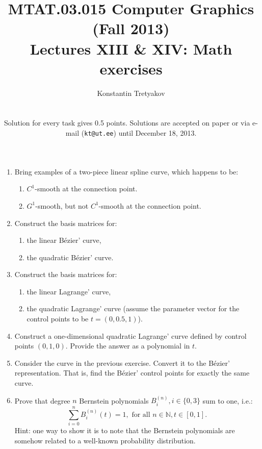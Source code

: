 \documentclass{article}
\newcommand{\Bezier}{B\'{e}zier}
\begin{document}
\title{MTAT.03.015 Computer Graphics (Fall 2013)\\
Lectures XIII \& XIV: Math exercises}
\author{Konstantin Tretyakov\\
\medskip
\\
\parbox{9cm}{\small Solution for every task gives 0.5 points. Solutions are accepted on paper or via e-mail (\texttt{kt@ut.ee}) until December 18, 2013.}
}
\date{}
\maketitle


\begin{enumerate}
\item Bring examples of a two-piece linear spline curve, which happens to be:
\begin{enumerate}
\item $C^1$-smooth at the connection point.
\item $G^1$-smooth, but not $C^1$-smooth at the connection point.
\end{enumerate}

\item Construct the basis matrices for:
\begin{enumerate}
\item the linear \Bezier' curve,
\item the quadratic \Bezier' curve.
\end{enumerate}

\item Construct the basis matrices for:
\begin{enumerate}
\item the linear Lagrange' curve,
\item the quadratic Lagrange' curve (assume the parameter vector for the control points to be $t=(0, 0.5, 1)$).
\end{enumerate}

\item Construct a one-dimensional quadratic Lagrange' curve defined by control points $(0, 1, 0)$. Provide the answer as a polynomial in $t$.

\item Consider the curve in the previous exercise. Convert it to the \Bezier' representation. That is, find the \Bezier' control points for exactly the same curve.

\item Prove that degree $n$ Bernstein polynomials $B_i^{(n)}, i\in\{0, 3\}$ sum to one, i.e.:
$$
\sum_{i=0}^n B_i^{(n)}(t) = 1,\text{   for all   }n\in\mathbb{N}, t\in[0,1].
$$
Hint: one way to show it is to note that the Bernstein polynomials are somehow related to a well-known probability distribution.


\end{enumerate}
\end{document}
